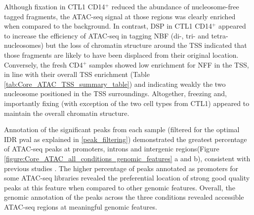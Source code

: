 Although fixation in CTL1 CD14$^+$ reduced the abundance of nucleosome-free tagged fragments, the ATAC-seq signal at those regions was clearly enriched when compared to the background. In contrast, DSP in CTL1 CD14$^+$ appeared to increase the efficiency of ATAC-seq in tagging NBF (di-, tri- and tetra-nucleosomes) but the loss of chromatin structure around the TSS indicated that those fragments are likely to have been displaced from their original location. Conversely, the fresh CD4$^+$ samples showed low enrichment for NFF in the TSS, in line with their overall TSS enrichment (Table \ref{tab:Core_ATAC_TSS_summary_table}) and indicating weakly the two nucleosome positioned in the TSS surroundings. Altogether, freezing and, importantly fixing (with exception of the two cell types from CTL1) appeared to maintain the overall chromatin structure.

Annotation of the significant peaks from each sample (filtered for the optimal IDR pval as explained in \ref{peak_filtering}) demonstrated the greatest percentage of ATAC-seq peaks at promoters, introns and intergenic regions(Figure \ref{figure:Core_ATAC_all_conditions_genomic_features} a and b), consistent with previous studies \parencite{Buenrostro2013,Scharer2016}. The higher percentage of peaks annotated as promoters for some ATAC-seq libraries revealed the preferential location of strong good quality peaks at this feature when compared to other genomic features. Overall, the genomic annotation of the peaks across the three conditions revealed accessible ATAC-seq regions at meaningful genomic features. 

